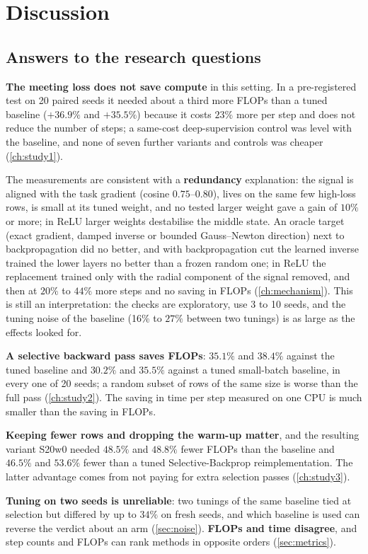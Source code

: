 \chapter{Discussion}\label{ch:discussion}

\section{Answers to the research questions}
\begin{description}[leftmargin=2.6em,style=nextline]
\item[RQ1] \textbf{The meeting loss does not save compute} in this setting. In a pre-registered test on 20 paired seeds it needed about a third more FLOPs than a tuned baseline ($+36.9\%$ and $+35.5\%$) because it costs $23\%$ more per step and does not reduce the number of steps; a same-cost deep-supervision control was level with the baseline, and none of seven further variants and controls was cheaper (\cref{ch:study1}).
\item[RQ2] The measurements are consistent with a \textbf{redundancy} explanation: the signal is aligned with the task gradient (cosine $0.75$--$0.80$), lives on the same few high-loss rows, is small at its tuned weight, and no tested larger weight gave a gain of $10\%$ or more; in ReLU larger weights destabilise the middle state. An oracle target (exact gradient, damped inverse or bounded Gauss--Newton direction) next to backpropagation did no better, and with backpropagation cut the learned inverse trained the lower layers no better than a frozen random one; in ReLU the replacement trained only with the radial component of the signal removed, and then at $20\%$ to $44\%$ more steps and no saving in FLOPs (\cref{ch:mechanism}). This is still an interpretation: the checks are exploratory, use 3 to 10 seeds, and the tuning noise of the baseline (16\% to $27\%$ between two tunings) is as large as the effects looked for.
\item[RQ3] \textbf{A selective backward pass saves FLOPs}: $35.1\%$ and $38.4\%$ against the tuned baseline and $30.2\%$ and $35.5\%$ against a tuned small-batch baseline, in every one of 20 seeds; a random subset of rows of the same size is worse than the full pass (\cref{ch:study2}). The saving in time per step measured on one CPU is much smaller than the saving in FLOPs.
\item[RQ4] \textbf{Keeping fewer rows and dropping the warm-up matter}, and the resulting variant S20w0 needed $48.5\%$ and $48.8\%$ fewer FLOPs than the baseline and $46.5\%$ and $53.6\%$ fewer than a tuned Selective-Backprop reimplementation. The latter advantage comes from not paying for extra selection passes (\cref{ch:study3}).
\item[RQ5] \textbf{Tuning on two seeds is unreliable}: two tunings of the same baseline tied at selection but differed by up to $34\%$ on fresh seeds, and which baseline is used can reverse the verdict about an arm (\cref{sec:noise}). \textbf{FLOPs and time disagree}, and step counts and FLOPs can rank methods in opposite orders (\cref{sec:metrics}).
\end{description}

